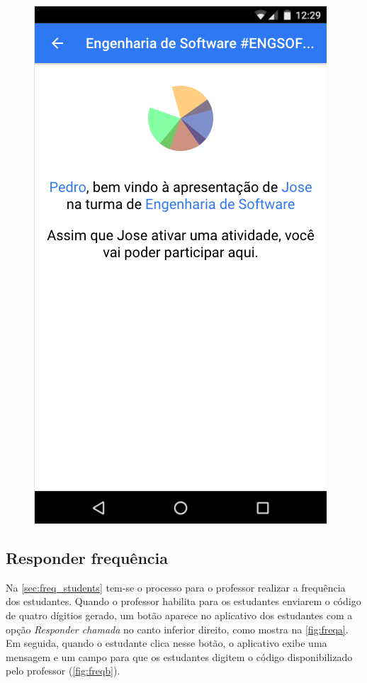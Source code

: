 \begin{figure}[h]
{    \includegraphics[scale=.4]{imagens/telas/app_ask_success}
    \label{fig:app_ask_b}
  }

  \doautor
  \label{fig:app_ask_id}
\end{figure}

\subsection{Responder frequência}

Na \autoref{sec:freq_students} tem-se o processo para o professor realizar
a frequência dos estudantes. Quando o professor habilita para os
estudantes enviarem o código de quatro dígitios gerado, um botão aparece
no aplicativo dos estudantes com a opção \textit{Responder chamada} no canto inferior
direito, como mostra na \autoref{fig:freqa}. Em seguida, quando o estudante
clica nesse botão, o aplicativo exibe uma mensagem e um campo para que os
estudantes digitem o código disponibilizado pelo professor (\autoref{fig:freqb}).

